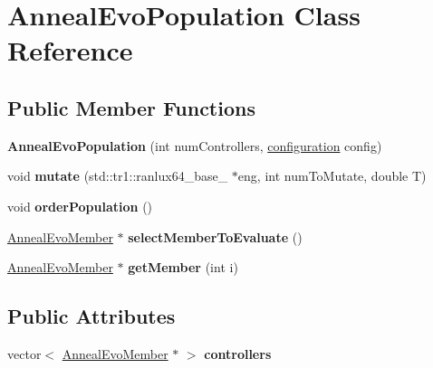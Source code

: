 \hypertarget{class_anneal_evo_population}{\section{Anneal\-Evo\-Population Class Reference}
\label{class_anneal_evo_population}
}
\subsection*{Public Member Functions}
\begin{DoxyCompactItemize}
\item 
\hypertarget{class_anneal_evo_population_a5cd7269130339c2c150fb12610d2cd79}{{\bfseries Anneal\-Evo\-Population} (int num\-Controllers, \hyperlink{classconfiguration}{configuration} config)}\label{class_anneal_evo_population_a5cd7269130339c2c150fb12610d2cd79}

\item 
\hypertarget{class_anneal_evo_population_acb949779f11a27a5448746a078ec2d17}{void {\bfseries mutate} (std\-::tr1\-::ranlux64\-\_\-base\-\_ $\ast$eng, int num\-To\-Mutate, double T)}\label{class_anneal_evo_population_acb949779f11a27a5448746a078ec2d17}

\item 
\hypertarget{class_anneal_evo_population_a188544d17492da2c8edbf4b7fb9b640f}{void {\bfseries order\-Population} ()}\label{class_anneal_evo_population_a188544d17492da2c8edbf4b7fb9b640f}

\item 
\hypertarget{class_anneal_evo_population_a974fdfab56b0b851cfe9b804c8b22e36}{\hyperlink{class_anneal_evo_member}{Anneal\-Evo\-Member} $\ast$ {\bfseries select\-Member\-To\-Evaluate} ()}\label{class_anneal_evo_population_a974fdfab56b0b851cfe9b804c8b22e36}

\item 
\hypertarget{class_anneal_evo_population_a73e97e2012f9b2cf7a109a247c77dd24}{\hyperlink{class_anneal_evo_member}{Anneal\-Evo\-Member} $\ast$ {\bfseries get\-Member} (int i)}\label{class_anneal_evo_population_a73e97e2012f9b2cf7a109a247c77dd24}

\end{DoxyCompactItemize}
\subsection*{Public Attributes}
\begin{DoxyCompactItemize}
\item 
\hypertarget{class_anneal_evo_population_aa1d274aa3646ed06e0ecca908315b526}{vector$<$ \hyperlink{class_anneal_evo_member}{Anneal\-Evo\-Member} $\ast$ $>$ {\bfseries controllers}}\label{class_anneal_evo_population_aa1d274aa3646ed06e0ecca908315b526}

\end{DoxyCompactItemize}


